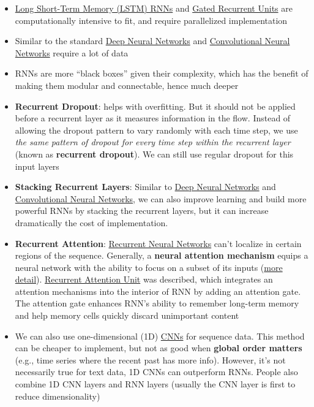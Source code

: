 \documentclass[
]{book}
\begin{document}
\begin{itemize}
\item
  \protect\hyperlink{long-short-term-memory-lstm-rnns}{Long Short-Term Memory (LSTM) RNNs} and \protect\hyperlink{gated-recurrent-units}{Gated Recurrent Units} are computationally intensive to fit, and require parallelized implementation
\item
  Similar to the standard \protect\hyperlink{deep-neural-networks}{Deep Neural Networks} and \protect\hyperlink{convolutional-neural-networks}{Convolutional Neural Networks} require a lot of data
\item
  RNNs are more ``black boxes'' given their complexity, which has the benefit of making them modular and connectable, hence much deeper
\item
  \textbf{Recurrent Dropout}: helps with overfitting. But it should not be applied before a recurrent layer as it measures information in the flow. Instead of allowing the dropout pattern to vary randomly with each time step, we use \emph{the same pattern of dropout for every time step within the recurrent layer} (known as \textbf{recurrent dropout}). We can still use regular dropout for this input layers
\item
  \textbf{Stacking Recurrent Layers}: Similar to \protect\hyperlink{deep-neural-networks}{Deep Neural Networks} and \protect\hyperlink{convolutional-neural-networks}{Convolutional Neural Networks}, we can also improve learning and build more powerful RNNs by stacking the recurrent layers, but it can increase dramatically the cost of implementation.
\item
  \textbf{Recurrent Attention}: \protect\hyperlink{recurrent-neural-networks}{Recurrent Neural Networks} can't localize in certain regions of the sequence. Generally, a \textbf{neural attention mechanism} equips a neural network with the ability to focus on a subset of its inputs (\href{http://akosiorek.github.io/ml/2017/10/14/visual-attention.html}{more detail}). \href{https://arxiv.org/abs/1810.12754}{Recurrent Attention Unit} was described, which integrates an attention mechanisms into the interior of RNN by adding an attention gate. The attention gate enhances RNN's ability to remember long-term memory and help memory cells quickly discard unimportant content \citet{zhong2020}
\item
  We can also use one-dimensional (1D) \protect\hyperlink{convolutional-neural-networks}{CNNs} for sequence data. This method can be cheaper to implement, but not as good when \textbf{global order matters} (e.g., time series where the recent past has more info). However, it's not necessarily true for text data, 1D CNNs can outperform RNNs. People also combine 1D CNN layers and RNN layers (usually the CNN layer is first to reduce dimensionality) \citep{alma991043601650103276}
\end{itemize}
\end{document}
